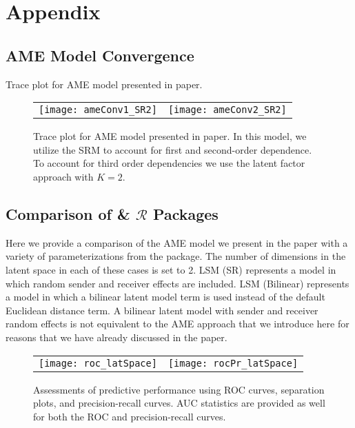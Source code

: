 \clearpage

\renewcommand{\thefigure}{A\arabic{figure}}
\setcounter{figure}{0}
\renewcommand{\thetable}{A.\arabic{table}}
\setcounter{table}{0}
\renewcommand{\thesection}{A.\arabic{section}}
\setcounter{section}{0}

\section{\textbf{Appendix}}

\subsection{AME Model Convergence}
\label{sec:ameConvAppendix}

Trace plot for AME model presented in paper.  

\begin{figure}[ht]
	\centering
	\begin{tabular}{cc}
	\texttt{[image: ameConv1\_SR2]} &
	\texttt{[image: ameConv2\_SR2]}
	\end{tabular}
	\caption{Trace plot for AME model presented in paper. In this model, we utilize the SRM to account for first and second-order dependence. To account for third order dependencies we use the latent factor approach with $K=2$.}
	\label{fig:ameConv}
\end{figure}
\FloatBarrier
\newpage

\subsection{Comparison of  \&  $\mathcal{R}$ Packages}
\label{sec:ameVsLatentnetAppendix}

Here we provide a comparison of the AME model we present in the paper with a variety of parameterizations from the  package. The number of dimensions in the latent space in each of these cases is set to 2. LSM (SR) represents a model in which random sender and receiver effects are included. LSM (Bilinear) represents a model in which a bilinear latent model term is used instead of the default Euclidean distance term. A bilinear latent model with sender and receiver random effects is not equivalent to the AME approach that we introduce here for reasons that we have already discussed in the paper. 



\begin{figure}[ht]
	\centering
	\begin{tabular}{cc}
	\texttt{[image: roc\_latSpace]} & 
	\texttt{[image: rocPr\_latSpace]}
	\end{tabular}
	\caption{Assessments of predictive performance using ROC curves, separation plots, and precision-recall curves. AUC statistics are provided as well for both the ROC and precision-recall curves.}
	\label{fig:roc_latentSpace}
\end{figure}

